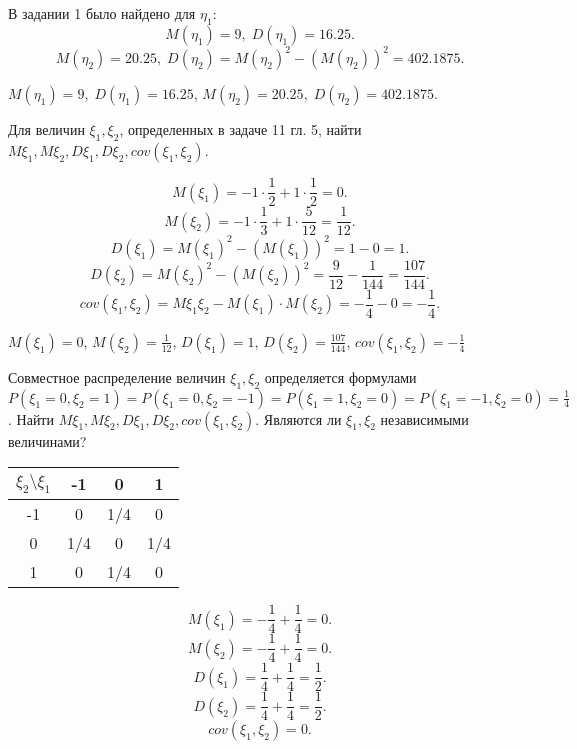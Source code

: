 \begin{solution} В задании 1 было найдено для $\eta_1$:
\[
M(\eta_1) = 9, \; D(\eta_1) = 16.25
.\] 
\[
M(\eta_2) = 20.25, \; D(\eta_2) = M(\eta_2)^2 - (M(\eta_2))^2 = 402.1875
.\] 
\end{solution}

\begin{result}
$M(\eta_1) = 9, \; D(\eta_1) = 16.25$, $M(\eta_2) = 20.25, \; D(\eta_2) = 402.1875$.
\end{result}
\medskip
\begin{task}{9}
  Для величин $\xi_1, \xi_2$, определенных в задаче 11 гл. 5, найти $M\xi_1, M\xi_2, D\xi_1, D\xi_2,
  cov(\xi_1, \xi_2)$.
\end{task}

\begin{solution}
\[
M(\xi_1) = -1 \cdot \frac{1}{2} + 1 \cdot  \frac{1}{2} = 0
.\] 
\[
M(\xi_2) = -1 \cdot  \frac{1}{3} + 1 \cdot  \frac{5}{12} = \frac{1}{12}
.\] 
\[
D(\xi_1) = M(\xi_1)^2 - (M(\xi_1))^2 = 1 - 0 = 1
.\] 
\[
D(\xi_2) = M(\xi_2)^2 - (M(\xi_2))^2 = \frac{9}{12} - \frac{1}{144} = \frac{107}{144}
.\] 
\[
cov(\xi_1, \xi_2) = M\xi_1\xi_2 - M(\xi_1) \cdot M(\xi_2) = -\frac{1}{4} - 0 = -\frac{1}{4}
.\] 
\end{solution}

\begin{result}
$M(\xi_1) = 0$, $M(\xi_2) = \frac{1}{12}$, $D(\xi_1) = 1$, $D(\xi_2) = \frac{107}{144}$, $cov(\xi_1,
\xi_2) = -\frac{1}{4}$
\end{result}
\medskip
\begin{task}{10}
  Совместное распределение величин $\xi_1, \xi_2$ определяется формулами $P\left(\xi_1 = 0, \xi_2 = 1\right) =
  P(\xi_1 =0, \xi_2 = -1) = P(\xi_1 = 1, \xi_2 = 0) = P(\xi_1 = -1, \xi_2 = 0) = \frac{1}{4}$.
  Найти $M\xi_1, M\xi_2, D\xi_1, D\xi_2, cov(\xi_1, \xi_2)$. Являются ли $\xi_1, \xi_2$ независимыми
  величинами? 
\end{task}

\begin{solution}
\par\medskip
\begin{tabular}{|c|c|c|c|}
  \hline
  $\xi_2  \setminus \xi_1$ & -1 & 0 & 1 \\
  \hline
  -1 & 0 & 1/4 & 0 \\
  \hline
  0 & 1/4 & 0 & 1/4 \\
  \hline
  1 & 0 & 1/4 & 0 \\
  \hline
\end{tabular}
\[
  M(\xi_1) = -\frac{1}{4} + \frac{1}{4} = 0
.\] 
\[
  M(\xi_2) = -\frac{1}{4} + \frac{1}{4} = 0
.\] 
\[
D(\xi_1) = \frac{1}{4} + \frac{1}{4} = \frac{1}{2}
.\] 
\[
D(\xi_2) = \frac{1}{4} + \frac{1}{4} = \frac{1}{2}
.\] 
\[
cov(\xi_1, \xi_2) = 0
.\] 

\end{solution}

